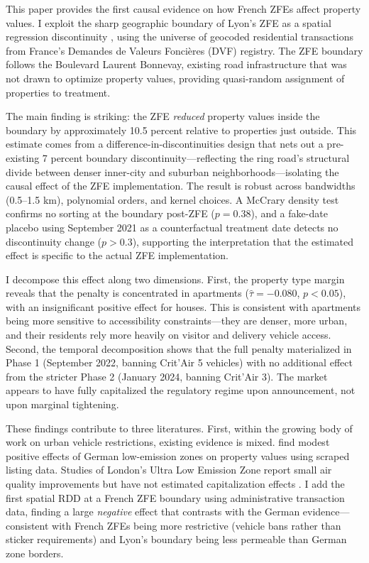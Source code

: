 \documentclass[12pt]{article}
\begin{document}
This paper provides the first causal evidence on how French ZFEs affect property values. I exploit the sharp geographic boundary of Lyon's ZFE as a spatial regression discontinuity \citep{keele2015geographic}, using the universe of geocoded residential transactions from France's Demandes de Valeurs Fonci\`eres (DVF) registry. The ZFE boundary follows the Boulevard Laurent Bonnevay, existing road infrastructure that was not drawn to optimize property values, providing quasi-random assignment of properties to treatment.

The main finding is striking: the ZFE \textit{reduced} property values inside the boundary by approximately 10.5 percent relative to properties just outside. This estimate comes from a difference-in-discontinuities design that nets out a pre-existing 7 percent boundary discontinuity---reflecting the ring road's structural divide between denser inner-city and suburban neighborhoods---isolating the causal effect of the ZFE implementation. The result is robust across bandwidths (0.5--1.5 km), polynomial orders, and kernel choices. A McCrary density test confirms no sorting at the boundary post-ZFE ($p = 0.38$), and a fake-date placebo using September 2021 as a counterfactual treatment date detects no discontinuity change ($p > 0.3$), supporting the interpretation that the estimated effect is specific to the actual ZFE implementation.

I decompose this effect along two dimensions. First, the property type margin reveals that the penalty is concentrated in apartments ($\hat\tau = -0.080$, $p < 0.05$), with an insignificant positive effect for houses. This is consistent with apartments being more sensitive to accessibility constraints---they are denser, more urban, and their residents rely more heavily on visitor and delivery vehicle access. Second, the temporal decomposition shows that the full penalty materialized in Phase 1 (September 2022, banning Crit'Air 5 vehicles) with no additional effect from the stricter Phase 2 (January 2024, banning Crit'Air 3). The market appears to have fully capitalized the regulatory regime upon announcement, not upon marginal tightening.

These findings contribute to three literatures. First, within the growing body of work on urban vehicle restrictions, existing evidence is mixed. \citet{sager2025environmental} find modest positive effects of German low-emission zones on property values using scraped listing data. Studies of London's Ultra Low Emission Zone report small air quality improvements but have not estimated capitalization effects \citep{kariel2025ulez}. I add the first spatial RDD at a French ZFE boundary using administrative transaction data, finding a large \textit{negative} effect that contrasts with the German evidence---consistent with French ZFEs being more restrictive (vehicle bans rather than sticker requirements) and Lyon's boundary being less permeable than German zone borders.
\end{document}
